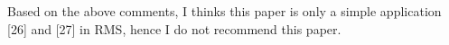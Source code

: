 \documentclass[10pt,journal]{IEEEtran}
\newcommand{\hide}[1]{\ignorespaces}
\begin{document}
Based on the above comments, I thinks this paper is only a simple
application [26] and [27] in RMS, hence I do not recommend this paper.


\hide{
\ifCLASSOPTIONcompsoc
  \section*{Acknowledgments}
\else
  \section*{Acknowledgment}
\fi

The authors would like to thank...
}

\ifCLASSOPTIONcaptionsoff
  \newpage
\fi





%
%
%


% 
\end{document}
